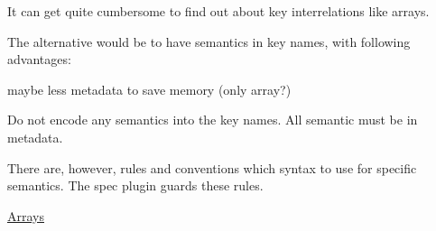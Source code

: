 It can get quite cumbersome to find out about key interrelations like arrays.

The alternative would be to have semantics in key names, with following advantages\+:


\begin{DoxyItemize}
\item maybe less metadata to save memory (only array?)
\end{DoxyItemize}

Do not encode any semantics into the key names. All semantic must be in metadata.

There are, however, rules and conventions which syntax to use for specific semantics. The {\ttfamily spec} plugin guards these rules.


\begin{DoxyItemize}
\item \hyperlink{doc_decisions_array_md}{Arrays}
\end{DoxyItemize}